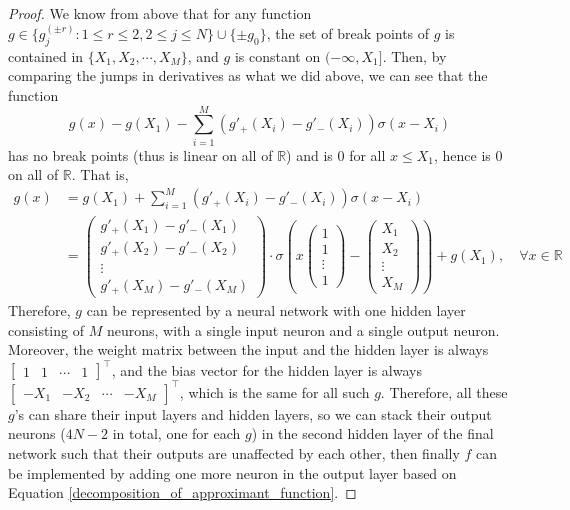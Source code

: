 \documentclass{article}
\numberwithin{equation}{section}
\theoremstyle{definition}
\begin{document}
\begin{proof}
We know from above that for any function $g\in \{g_{j}^{(\pm r)}: 1\le r\le 2, 2\le j\le N\}\cup\{\pm g_0\}$, the set of break points of $g$ is contained in $\{X_1,X_2,\cdots,X_M\}$, and $g$ is constant on $(-\infty,X_1]$. Then, by comparing the jumps in derivatives as what we did above, we can see that the function
\[
    g(x) - g(X_1) -  \sum_{i=1}^{M} \left(g'_{+}(X_i)-g'_{-}(X_i)\right)\sigma(x-X_i)
\]
has no break points (thus is linear on all of $\mathbb{R}$) and is $0$ for all $x\le X_1$, hence is $0$ on all of $\mathbb{R}$. That is,
\begin{align}
    g(x) &= g(X_1) +  \sum_{i=1}^{M} \left(g'_{+}(X_i)-g'_{-}(X_i)\right)\sigma(x-X_i)  \nonumber  \\
    &= \begin{pmatrix} g'_{+}(X_1)-g'_{-}(X_1) \\ g'_{+}(X_2)-g'_{-}(X_2) \\ \vdots \\ g'_{+}(X_M)-g'_{-}(X_M) \end{pmatrix}
    \cdot \sigma\left(x \begin{pmatrix} 1 \\ 1 \\ \vdots \\ 1 \end{pmatrix} - 
    \begin{pmatrix} X_1 \\ X_2 \\ \vdots \\ X_M \end{pmatrix}\right) + g(X_1),
    \quad
    \forall x \in \mathbb{R} \label{eq:second_layer}
\end{align}
Therefore, $g$ can be represented by a neural network with one hidden layer consisting of $M$ neurons, with a single input neuron and a single output neuron. Moreover, the weight matrix between the input and the hidden layer is always $\begin{bmatrix} 1 & 1 & \cdots & 1 \end{bmatrix}^{\top}$, and the bias vector for the hidden layer is always $\begin{bmatrix} -X_1 & -X_2 & \cdots & -X_M \end{bmatrix}^{\top}$, which is the same for all such $g$. Therefore, all these $g$'s can share their input layers and hidden layers, so we can stack their output neurons ($4N-2$ in total, one for each $g$) in the second hidden layer of the final network such that their outputs are unaffected by each other, then finally $f$ can be implemented by adding one more neuron in the output layer based on Equation \ref{decomposition_of_approximant_function}.


\end{proof}
\end{document}
